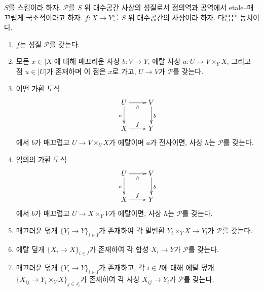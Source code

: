 \begin{lemma}
\label{lemma-etale-smooth-local-source-target-characterize}
$S$를 스킴이라 하자. $\mathcal{P}$를 $S$ 위 대수공간 사상의 성질로서
정의역과 공역에서 etale--매끄럽게 국소적이라고 하자. $f:X\to Y$를
$S$ 위 대수공간의 사상이라 하자. 다음은 동치이다.
\begin{enumerate}
\item[(a)] $f$는 성질 $\mathcal{P}$를 갖는다.
\item[(b)] 모든 $x\in|X|$에 대해 매끄러운 사상 $b:V\to Y$, 에탈 사상
$a:U\to V\times_YX$, 그리고 점 $u\in|U|$가 존재하며 이 점은 $x$로 가고,
$U\to V$가 $\mathcal{P}$를 갖는다.
\item[(c)] 어떤 가환 도식
$$
\xymatrix{
U \ar[d]_a \ar[r]_h & V \ar[d]^b \\
X \ar[r]^f & Y
}
$$
에서 $b$가 매끄럽고 $U\to V\times_YX$가 에탈이며 $a$가 전사이면,
사상 $h$는 $\mathcal{P}$를 갖는다.
\item[(d)] 임의의 가환 도식
$$
\xymatrix{
U \ar[d]_a \ar[r]_h & V \ar[d]^b \\
X \ar[r]^f & Y
}
$$
에서 $b$가 매끄럽고 $U\to X\times_YV$가 에탈이면, 사상 $h$는
$\mathcal{P}$를 갖는다.
\item[(e)] 매끄러운 덮개 $\{Y_i\to Y\}_{i\in I}$가 존재하여 각 밑변환
$Y_i\times_YX\to Y_i$가 $\mathcal{P}$를 갖는다.
\item[(f)] 에탈 덮개 $\{X_i\to X\}_{i\in I}$가 존재하여 각 합성
$X_i\to Y$가 $\mathcal{P}$를 갖는다.
\item[(g)] 매끄러운 덮개 $\{Y_i\to Y\}_{i\in I}$가 존재하고, 각
$i\in I$에 대해 에탈 덮개 $\{X_{ij}\to Y_i\times_YX\}_{j\in J_i}$가
존재하여 각 사상 $X_{ij}\to Y_i$가 $\mathcal{P}$를 갖는다.
\end{enumerate}
\end{lemma}

